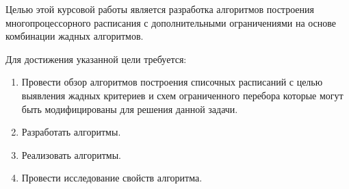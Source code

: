 Целью этой курсовой работы является разработка алгоритмов построения многопроцессорного расписания с дополнительными ограничениями на основе комбинации жадных алгоритмов. 

Для достижения указанной цели требуется:
\begin{enumerate}
    \item Провести обзор алгоритмов построения списочных расписаний с целью выявления жадных критериев и схем ограниченного перебора которые могут быть модифицированы для решения данной задачи.
    \item Разработать алгоритмы.
    \item Реализовать алгоритмы.
    \item Провести исследование свойств алгоритма. 
\end{enumerate}